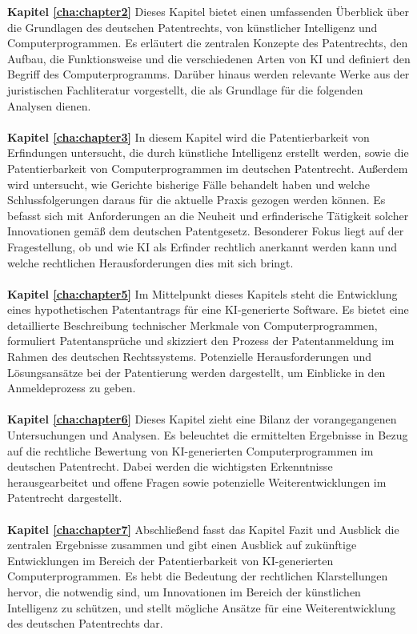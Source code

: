 \textbf{Kapitel \ref{cha:chapter2}} 
Dieses Kapitel bietet einen umfassenden Überblick über die Grundlagen des deutschen Patentrechts, 
von künstlicher Intelligenz und Computerprogrammen. 
Es erläutert die zentralen Konzepte des Patentrechts, 
den Aufbau, 
die Funktionsweise und die verschiedenen Arten von KI und definiert den Begriff des Computerprogramms. 
Darüber hinaus werden relevante Werke aus der juristischen Fachliteratur vorgestellt, 
die als Grundlage für die folgenden Analysen dienen.
\\
\\
\textbf{Kapitel \ref{cha:chapter3}} 
In diesem Kapitel wird die Patentierbarkeit von Erfindungen untersucht,
die durch künstliche Intelligenz erstellt werden, 
sowie die Patentierbarkeit von Computerprogrammen im deutschen Patentrecht. 
Außerdem wird untersucht, wie Gerichte bisherige Fälle behandelt haben 
und welche Schlussfolgerungen daraus für die aktuelle Praxis gezogen werden können. 
Es befasst sich mit Anforderungen an die Neuheit 
und erfinderische Tätigkeit solcher Innovationen gemäß dem deutschen Patentgesetz. 
Besonderer Fokus liegt auf der Fragestellung, 
ob und wie KI als Erfinder rechtlich anerkannt werden kann 
und welche rechtlichen Herausforderungen dies mit sich bringt.
\\
\\
\textbf{Kapitel \ref{cha:chapter5}} 
Im Mittelpunkt dieses Kapitels steht die Entwicklung eines hypothetischen Patentantrags 
für eine KI-generierte Software. 
Es bietet eine detaillierte Beschreibung technischer Merkmale von Computerprogrammen, 
formuliert Patentansprüche und skizziert den Prozess der Patentanmeldung im Rahmen des deutschen Rechtssystems. 
Potenzielle Herausforderungen und Lösungsansätze bei der Patentierung werden dargestellt, 
um Einblicke in den Anmeldeprozess zu geben.
\\
\\
\textbf{Kapitel \ref{cha:chapter6}} 
Dieses Kapitel zieht eine Bilanz der vorangegangenen Untersuchungen und Analysen. 
Es beleuchtet die ermittelten Ergebnisse in Bezug auf die rechtliche Bewertung 
von KI-generierten Computerprogrammen im deutschen Patentrecht. 
Dabei werden die wichtigsten Erkenntnisse herausgearbeitet 
und offene Fragen sowie potenzielle Weiterentwicklungen im Patentrecht dargestellt.
\\
\\
\textbf{Kapitel \ref{cha:chapter7}} 
Abschließend fasst das Kapitel Fazit und Ausblick die zentralen Ergebnisse zusammen 
und gibt einen Ausblick auf zukünftige Entwicklungen im Bereich der Patentierbarkeit 
von KI-generierten Computerprogrammen. 
Es hebt die Bedeutung der rechtlichen Klarstellungen hervor, 
die notwendig sind, um Innovationen im Bereich der künstlichen Intelligenz zu schützen, 
und stellt mögliche Ansätze für eine Weiterentwicklung des deutschen Patentrechts dar.